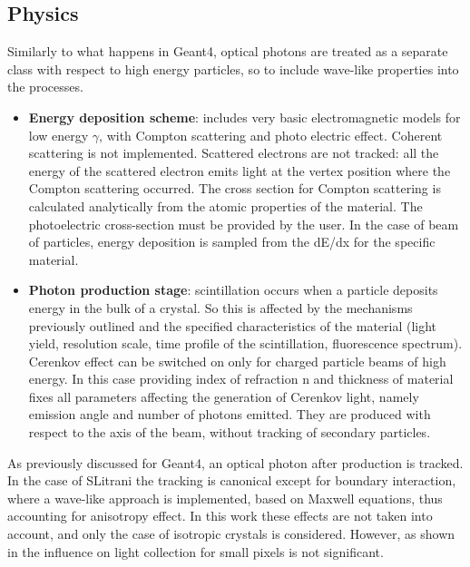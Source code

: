 \subsection{Physics}
Similarly to what happens in Geant4, optical photons are treated as a separate class with respect to high energy particles, so to include wave-like properties into the processes.
\begin{itemize}
\item \textbf{Energy deposition scheme}: includes very basic electromagnetic models for low energy $\gamma$, with Compton scattering and photo electric effect. Coherent scattering is not implemented. Scattered electrons are not tracked: all the energy of the scattered electron emits light at the vertex position where the Compton scattering occurred. 
The cross section for Compton scattering is calculated analytically from the atomic properties of the material.
The photoelectric cross-section must be provided by the user.
In the case of beam of particles, energy deposition is sampled from the dE/dx for the specific material.
\item \textbf{Photon production stage}: scintillation occurs when a particle deposits energy in the bulk of a crystal. So this is affected by the mechanisms previously outlined and the specified characteristics of the material (light yield, resolution scale, time profile of the scintillation, fluorescence spectrum).
Cerenkov effect can be switched on only for charged particle beams of high energy. In this case providing index of refraction n and thickness of material fixes all parameters affecting the generation of Cerenkov light, namely emission angle and number of photons emitted. They are produced with respect to the axis of the beam, without tracking of secondary particles.
\end{itemize}
As previously discussed for Geant4, an optical photon after production is tracked. In the case of SLitrani the tracking is canonical except for boundary interaction, where a wave-like approach is implemented, based on Maxwell equations, thus accounting for anisotropy effect. In this work these effects are not taken into account, and only the case of isotropic crystals is considered. However, as shown in \cite{Cuccia2013} the influence on light collection for small pixels is not significant.
